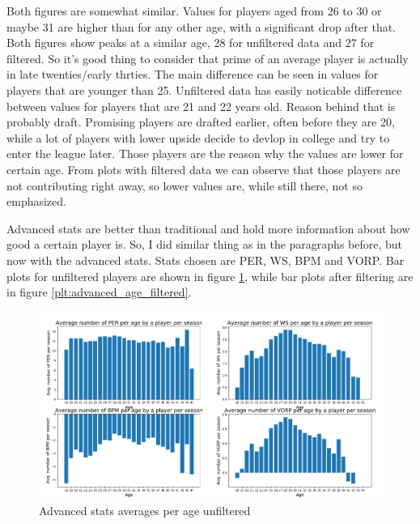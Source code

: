 \documentclass[a4paper]{article}
\begin{document}
Both figures are somewhat similar. Values for players aged from 26 to 30 or maybe 31 are higher than for any other age, with a significant drop after that. Both figures show peaks at a similar age, 28 for unfiltered data and 27 for filtered. So it's good thing to consider that prime of an average player is actually in late twenties/early thrties. The main difference can be seen in values for players that are younger than 25. Unfiltered data has easily noticable difference between values for players that are 21 and 22 years old. Reason behind that is probably draft. Promising players are drafted earlier, often before they are 20, while a lot of players with lower upside decide to devlop in college and try to enter the league later. Those players are the reason why the values are lower for certain age. From plots with filtered data we can observe that those players are not contributing right away, so lower values are, while still there, not so emphasized.

Advanced stats are better than traditional and hold more information about how good a certain player is. So, I did similar thing as in the paragraphs before, but now with the advanced stats. Stats chosen are PER, WS, BPM and VORP. Bar plots for unfiltered players are shown in figure \ref{plt:advanced_age}, while bar plots after filtering are in figure \ref{plt:advanced_age_filtered}.


\begin{figure}[h!]
\begin{center}
\includegraphics[scale=0.3]{advanced_stats_per_age.png}
\end{center}
\caption{Advanced stats averages per age unfiltered}
\label{plt:advanced_age}
\end{figure}
\end{document}
